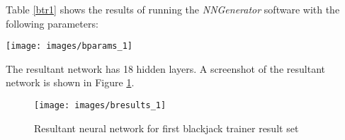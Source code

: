 Table \ref{btr1} shows the results of running the {\it NNGenerator} software with the following parameters:

\begin{center}
\texttt{[image: images/bparams\_1]}
\end{center}

The resultant network has 18 hidden layers.
A screenshot of the resultant network is shown in Figure \ref{bresults_1}.

\begin{figure}[h!]
  \centering
  \texttt{[image: images/bresults\_1]}
  \caption{Resultant neural network for first blackjack trainer result set}
  \label{bresults_1}
\end{figure}

